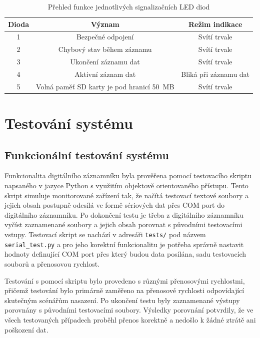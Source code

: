 \begin{table}[h]
    \centering
    \begin{tabular}{|c|c|c|}
        \hline
        \textbf{Dioda} & \textbf{Význam} & \textbf{Režim indikace}              \\
        \hline
        1 & Bezpečné odpojení                          & Svítí trvale          \\
        \hline
        2 & Chybový stav během záznamu                 & Svítí trvale          \\
        \hline
        3 & Ukončení záznamu dat\footnote              & Svítí trvale          \\
        \hline
        4 & Aktivní záznam dat                         & Bliká při záznamu dat \\
        \hline
        5 & Volná paměť SD karty je pod hranicí 50~MB  & Svítí trvale          \\
        \hline
    \end{tabular}
    \caption{Přehled funkce jednotlivých signalizačních LED diod}
    \label{tab:signal_leds}
\end{table}

\chapter{Testování systému}
\label{testovani_systemu}

\section{Funkcionální testování systému}
Funkcionalita digitálního záznamníku byla prověřena pomocí testovacího skriptu napsaného v jazyce Python s využitím objektově orientovaného přístupu. Tento skript simuluje monitorované zařízení tak, že načítá testovací textové soubory a jejich obsah postupně odesílá ve formě sériových dat přes COM port do digitálního záznamníku. Po dokončení testu je třeba z digitálního záznamníku vyčíst zaznamenané soubory a jejich obsah porovnat s původními testovacími vstupy. Testovací skript se nachází v adresáři \texttt{tests/} pod názvem \texttt{serial\_test.py} a pro jeho korektní funkcionalitu je potřeba správně nastavit hodnoty definující COM port přes který budou data posílána, sadu testovacích souborů a přenosovou rychlost.

Testování s pomocí skriptu bylo provedeno s různými přenosovými rychlostmi, přičemž testování bylo primárně zaměřeno na přenosové rychlosti odpovídající skutečným scénářům nasazení. Po ukončení testu byly zaznamenané výstupy porovnány s původními testovacími soubory. Výsledky porovnání potvrdily, že ve všech testovaných případech proběhl přenos korektně a nedošlo k žádné ztrátě ani poškození dat.

